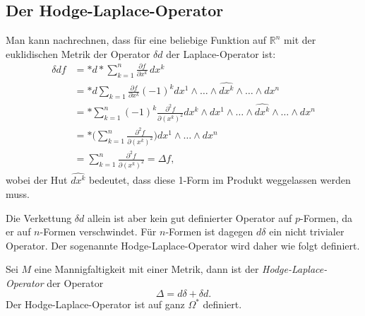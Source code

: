 %
%
\subsection{Der Hodge-Laplace-Operator}
Man kann nachrechnen, dass für eine beliebige Funktion auf
$\mathbb{R}^n$ mit der euklidischen Metrik der Operator $\delta d$
der Laplace-Operator ist:
\begin{align*}
\delta d f
&=
{\ast}d{\ast}\sum_{k=1}^n \frac{\partial f}{\partial x^k}\,dx^k
\\
&=
{\ast}d\sum_{k=1} \frac{\partial f}{\partial x^k}
(-1)^k
dx^1\wedge\dots\wedge \widehat{dx^k}\wedge\dots\wedge dx^n
\\
&=
{\ast}
\sum_{k=1}^n
(-1)^k
\frac{\partial^2 f}{\partial (x^k)^2}
dx^k\wedge dx^1\wedge\dots\wedge\widehat{dx^k}\wedge\dots\wedge dx^n
\\
&=
{\ast}
\biggl(
\sum_{k=1}^n
\frac{\partial^2 f}{\partial (x^k)^2}
\biggr)
dx^1\wedge\dots\wedge dx^n
\\
&=
\sum_{k=1}^n \frac{\partial^2 f}{\partial (x^k)^2}
=
\Delta f,
\end{align*}
wobei der Hut $\widehat{dx^k}$ bedeutet, dass diese 1-Form im
Produkt weggelassen werden muss.

Die Verkettung $\delta d$ allein ist aber kein gut definierter
Operator auf $p$-Formen, da er auf $n$-Formen verschwindet.
Für $n$-Formen ist dagegen $d\delta$ ein nicht trivialer Operator.
Der sogenannte Hodge-Laplace-Operator wird daher wie folgt definiert.

\begin{definition}
\label{buch:hodge:laplace:def:hodgelaplace}
Sei $M$ eine Mannigfaltigkeit mit einer Metrik, dann ist
der {\em Hodge-Laplace-Operator} der Operator
%
\[
\Delta = d\delta + \delta d.
\]
Der Hodge-Laplace-Operator ist auf ganz $\Omega^*$ definiert.
\end{definition}

